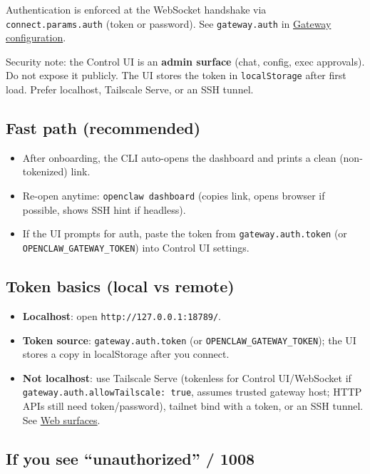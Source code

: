 Authentication is enforced at the WebSocket handshake via \texttt{connect.params.auth}
(token or password). See \texttt{gateway.auth} in \href{/gateway/configuration}{Gateway configuration}.

Security note: the Control UI is an \textbf{admin surface} (chat, config, exec approvals).
Do not expose it publicly. The UI stores the token in \texttt{localStorage} after first load.
Prefer localhost, Tailscale Serve, or an SSH tunnel.

\subsection{Fast path (recommended)}


\begin{itemize}
  \item After onboarding, the CLI auto-opens the dashboard and prints a clean (non-tokenized) link.
  \item Re-open anytime: \texttt{openclaw dashboard} (copies link, opens browser if possible, shows SSH hint if headless).
  \item If the UI prompts for auth, paste the token from \texttt{gateway.auth.token} (or \texttt{OPENCLAW\_GATEWAY\_TOKEN}) into Control UI settings.
\end{itemize}


\subsection{Token basics (local vs remote)}


\begin{itemize}
  \item \textbf{Localhost}: open \texttt{http://127.0.0.1:18789/}.
  \item \textbf{Token source}: \texttt{gateway.auth.token} (or \texttt{OPENCLAW\_GATEWAY\_TOKEN}); the UI stores a copy in localStorage after you connect.
  \item \textbf{Not localhost}: use Tailscale Serve (tokenless for Control UI/WebSocket if \texttt{gateway.auth.allowTailscale: true}, assumes trusted gateway host; HTTP APIs still need token/password), tailnet bind with a token, or an SSH tunnel. See \href{/web}{Web surfaces}.
\end{itemize}


\subsection{If you see “unauthorized” / 1008}


